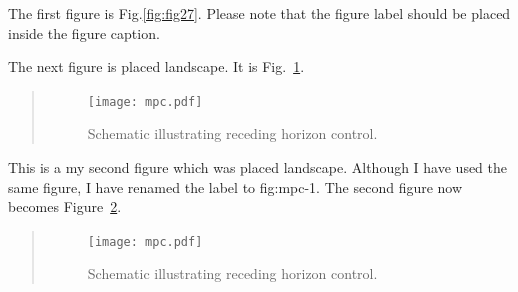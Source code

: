 
The first figure is Fig.\ref{fig:fig27}.   Please note that the figure label should be placed inside the figure caption.  
\newpage

The next figure is placed landscape.  It is Fig.~\ref{fig:mpc}.


\begin{landscape}
\renewcommand{\baselinestretch}{1}
\small\normalsize
\begin{quote}
\begin{figure}
\begin{center}
\texttt{[image: mpc.pdf]}
\end{center}
\caption{Schematic illustrating receding horizon control.
\label{fig:mpc} }
\end{figure}
\end{quote}
\renewcommand{\baselinestretch}{2}
\small\normalsize
\end{landscape}

This is a my second figure which was placed landscape.  Although I have used the same figure, I have renamed the label to fig:mpc-1.  The second figure now becomes Figure~\ref{fig:mpc-1}.
\begin{landscape}
\renewcommand{\baselinestretch}{1}
\small\normalsize
\begin{quote}
\begin{figure}
\begin{center}
\texttt{[image: mpc.pdf]}
\end{center}
\caption[Figure placed landscape on page.]{Schematic illustrating receding horizon control. \label{fig:mpc-1}}
\end{figure}
\end{quote}
\renewcommand{\baselinestretch}{2}
\small\normalsize
\end{landscape}


